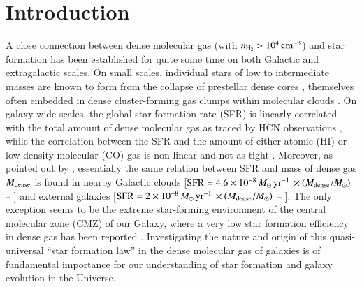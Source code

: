 \documentclass{aa}
\begin{document}
\maketitle
%

\section{Introduction}\label{sect:Intro}

A close connection between dense molecular gas (with $n_{\rm H_2}  > 10^4\, {\rm cm}^{-3} $) 
and star formation has been established for quite some time on 
both Galactic and extragalactic scales.
On small scales, individual stars of low to intermediate masses are known to form from the collapse of prestellar dense cores \citep[e.g.][]{Myers83,Ward-Thompson94,Andre00}, themselves often embedded in dense cluster-forming gas clumps 
within molecular clouds \citep[e.g.][]{Lada92,Myers98}.
On galaxy-wide scales, the global star formation rate (SFR) is linearly correlated with the total amount of dense molecular gas as traced by HCN observations \citep{Gao04b,Gao04a}, while the correlation between the SFR and the amount of either atomic (HI) or low-density molecular (CO) gas 
is non linear and not as tight \citep[e.g.][]{Kennicutt89}.
Moreover, as pointed out by \citet{Lada12}, essentially the same relation between 
SFR and mass of dense gas 
$M_{\rm dense}$ is found in nearby Galactic clouds 
[${\rm SFR} = 4.6 \times 10^{-8}\,  M_\odot \, {\rm yr}^{-1}\, \times \left(M_{\rm dense}/M_\odot \right) $ -- \citet{Lada10}]
and external galaxies 
[${\rm SFR} = 2 \times 10^{-8}\,  M_\odot \, {\rm yr}^{-1}\, \times \left(M_{\rm dense}/M_\odot \right) $ -- \citet{Gao04a}]. 
{The only exception seems to be the extreme star-forming environment of the central molecular zone (CMZ) of our Galaxy, 
where a very low star formation efficiency in dense gas has been reported \citep{Longmore13}.}
Investigating the nature and origin of this quasi-universal ``star formation law'' in the dense molecular gas of galaxies 
is of fundamental importance for our understanding of star formation and galaxy evolution in the Universe.
\end{document}
